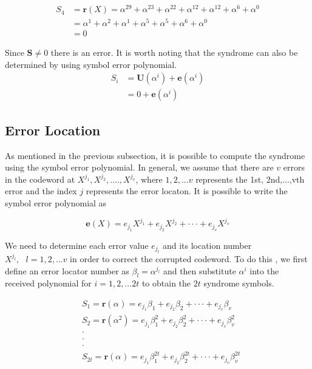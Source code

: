 \documentclass[fontsize=12pt]{article}
\begin{document}
\begin{equation}
\begin{split}
{S}_4& =\mathbf{r}(X)= \alpha^29 + \alpha^23+ \alpha^22+\alpha^12 + \alpha^12 + \alpha^6 +\alpha^0\\
 &=\alpha^1 + \alpha^2+ \alpha^1+\alpha^5 + \alpha^5 + \alpha^6 +\alpha^0\\
 &= 0
 \end{split}
\end{equation}

Since $\mathbf{S}\neq 0$ there is an error. It is worth noting that the syndrome can also be determined by using symbol error polynomial.
\begin{equation}
\begin{split}
{S}_i& =\mathbf{U}(\alpha^i)+ \mathbf{e}(\alpha^i)\\
 &= 0+\mathbf{e}(\alpha^i)
 \end{split}
\end{equation}

\subsection{Error Location}
As mentioned in the previous subsection, it is possible to compute the syndrome using the symbol error polynomial. In general, we assume that there are  $v$ errors in the codeword at $X^{j_1}, X^{j_2},....,X^{j_v}$, where $1,2,...v$  represents the 1st, 2nd,...,vth error and the index $j$ represents the error locaton. It is possible to write the symbol error polynomial as 

\begin{equation}
\mathbf{e}(X) =e_{j_1} X^{j_1} + e_{j_2} X^{j_2}+\cdot\cdot\cdot+e_{j_v} X^{j_v}
\end{equation}

We need to determine each error value $e_{j_\mathit{l}}$ and its location number$X^{j_\mathit{l}},\,\,\,\, \mathit{l}=1,2,...v$ in order to correct the corrupted codeword. To do this , we first define an error locator number as $\beta_l=\alpha^{j_l}$ and then substitute $\alpha^i$ into the received polynomial for $i=1,2,...2t$ to obtain the $2t$ syndrome symbols.

\begin{equation}
\begin{split}
&{S}_1 =\mathbf{r}(\alpha^{})=e_{j_1} \beta_{1}^{} + e_{j_2} \beta_{2}^{}+\cdot\cdot\cdot+e_{j_v} \beta_{v}^{}\\
 &{S}_2 =\mathbf{r}(\alpha^2)=e_{j_1} \beta_{1}^{2} + e_{j_2} \beta_{2}^{2}+\cdot\cdot\cdot+e_{j_v} \beta_{v}^{2}\\
 &\cdot\\
  &\cdot\\
   &\cdot\\
 &{S}_{2t} =\mathbf{r}(\alpha^{})=e_{j_1} \beta_{1}^{2t} + e_{j_2} \beta_{2}^{2t}+\cdot\cdot\cdot+e_{j_v} \beta_{v}^{2t}\\
 \end{split}
 \label{seventeen}
\end{equation}
\end{document}
